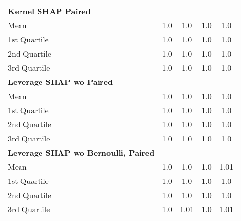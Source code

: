 {\begin{tabular} {lcccc}
\addlinespace[1ex] 
\textbf{Kernel SHAP Paired} &  &  &  &  \\ 
\hspace{7pt}Mean & 1.0 & 1.0 & 1.0 & 1.0 \\ 
\hspace{7pt}1st Quartile & 1.0 & 1.0 & 1.0 & \cellcolor{silver!60}1.0 \\ 
\hspace{7pt}2nd Quartile & 1.0 & 1.0 & 1.0 & \cellcolor{bronze!60}1.0 \\ 
\hspace{7pt}3rd Quartile & 1.0 & 1.0 & 1.0 & 1.0 \\ 
\addlinespace[1ex] 
\textbf{Leverage SHAP wo Paired} &  &  &  &  \\ 
\hspace{7pt}Mean & \cellcolor{bronze!60}1.0 & \cellcolor{gold!60}1.0 & \cellcolor{gold!60}1.0 & \cellcolor{bronze!60}1.0 \\ 
\hspace{7pt}1st Quartile & \cellcolor{bronze!60}1.0 & \cellcolor{silver!60}1.0 & \cellcolor{gold!60}1.0 & 1.0 \\ 
\hspace{7pt}2nd Quartile & \cellcolor{silver!60}1.0 & \cellcolor{gold!60}1.0 & \cellcolor{gold!60}1.0 & 1.0 \\ 
\hspace{7pt}3rd Quartile & \cellcolor{silver!60}1.0 & \cellcolor{gold!60}1.0 & \cellcolor{silver!60}1.0 & \cellcolor{bronze!60}1.0 \\ 
\addlinespace[1ex] 
\textbf{Leverage SHAP wo Bernoulli, Paired} &  &  &  &  \\ 
\hspace{7pt}Mean & 1.0 & 1.0 & 1.0 & 1.01 \\ 
\hspace{7pt}1st Quartile & 1.0 & 1.0 & 1.0 & 1.0 \\ 
\hspace{7pt}2nd Quartile & 1.0 & 1.0 & 1.0 & 1.0 \\ 
\hspace{7pt}3rd Quartile & 1.0 & 1.01 & 1.0 & 1.01 \\ 
\bottomrule
\end{tabular}}